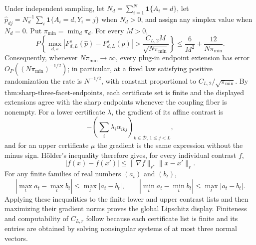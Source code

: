 Under independent sampling, let \(N_d=\sum_{i=1}^N\mathbf 1\{A_i=d\}\), let \(\widehat p_{dj}=N_d^{-1}\sum_i\mathbf 1\{A_i=d,Y_i=j\}\) when \(N_d>0\), and assign any simplex value when \(N_d=0\).  Put \(\pi_{\min}=\min_d\pi_d\).  For every \(M>0\),
\[
 P\left\{
 \max_{d,s}|F_{d,L}^s(\widehat p)-F_{d,L}^s(p)|>
 \frac{C_{L,2}M}{\sqrt{N\pi_{\min}}}
 \right\}
 \le \frac{6}{M^2}+\frac{12}{N\pi_{\min}}.
\]
Consequently, whenever \(N\pi_{\min}\to\infty\), every plug-in endpoint extension has error \(O_P((N\pi_{\min})^{-1/2})\); in particular, at a fixed law satisfying positive randomization the rate is \(N^{-1/2}\), with constant proportional to \(C_{L,2}/\sqrt{\pi_{\min}}\).
By \(\text{thm:sharp-three-facet-endpoints}\), each certificate set is finite and the displayed extensions agree with the sharp endpoints whenever the coupling fiber is nonempty.  For a lower certificate \(\lambda\), the gradient of its affine contrast is
\[
 -\left(\sum_i\lambda_i\alpha_{ikj}\right)_{k\in\mathcal D,\,1\le j<L},
\]
and for an upper certificate \(\mu\) the gradient is the same expression without the minus sign.  Hölder's inequality therefore gives, for every individual contrast \(f\),
\[
 |f(x)-f(x')|\le\|\nabla f\|_{r^*}\|x-x'\|_r.
\]
For any finite families of real numbers \((a_t)\) and \((b_t)\),
\[
 |\max_t a_t-\max_t b_t|\le\max_t|a_t-b_t|,
 \qquad
 |\min_t a_t-\min_t b_t|\le\max_t|a_t-b_t|.
\]
Applying these inequalities to the finite lower and upper contrast lists and then maximizing their gradient norms proves the global Lipschitz display.  Finiteness and computability of \(C_{L,r}\) follow because each certificate list is finite and its entries are obtained by solving nonsingular systems of at most three normal vectors.

